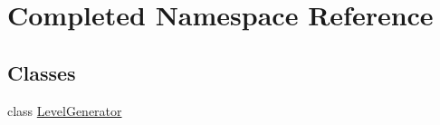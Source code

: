 \hypertarget{namespace_completed}{}\section{Completed Namespace Reference}
\label{namespace_completed}
\subsection*{Classes}
\begin{DoxyCompactItemize}
\item 
class \mbox{\hyperlink{class_completed_1_1_level_generator}{Level\+Generator}}
\end{DoxyCompactItemize}
